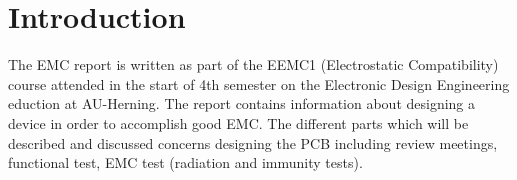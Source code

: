 \chapter{Introduction}
The EMC report is written as part of the EEMC1 (Electrostatic Compatibility) course attended in the start of 4th semester on the Electronic Design Engineering eduction at AU-Herning. The report contains information about designing a device in order to accomplish good EMC. The different parts which will be described and discussed concerns designing the PCB including review meetings, functional test, EMC test (radiation and immunity tests).

\newpage